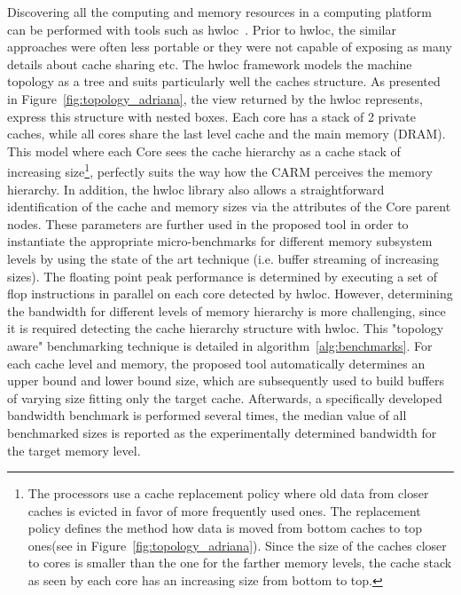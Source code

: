 \documentclass[twoside,twocolumn,9pt]{extarticle}
\begin{document}
Discovering all the computing and memory resources in a computing platform can be performed with tools such as
hwloc~\cite{goglin:hal-01330194}. Prior to hwloc,  the similar approaches were often less portable or they were not capable of
exposing as many details about cache sharing etc. The hwloc framework models the machine topology as a tree and suits particularly
well the caches structure.
As presented in Figure~\ref{fig:topology_adriana}, the view returned by the hwloc represents, express this structure with nested
boxes. Each core has a stack of 2 private caches, while all cores share the last level cache and the main memory (DRAM).
This model where each Core sees  the cache hierarchy as a cache stack of increasing size\footnote{
  The processors use a cache replacement policy where old data from closer caches is evicted in favor of more frequently used ones.
  The replacement policy defines the method how data is moved from bottom caches to top ones(see in
  Figure~\ref{fig:topology_adriana}). Since the size of the caches closer to cores is smaller than the one for the farther memory
  levels, the cache stack as seen by each core has an increasing size from bottom to top.
}, perfectly suits the way how the CARM perceives the memory hierarchy.
In addition, the hwloc library also allows a straightforward identification of the cache and memory sizes via the  attributes of
the Core parent nodes. These parameters are further used in the proposed tool  in order to instantiate the appropriate
micro-benchmarks for different memory subsystem levels by using the state of the art technique (i.e. buffer streaming of
increasing sizes).
The floating point peak performance is determined by executing a set of flop instructions in parallel on each core detected by
hwloc. However, determining the bandwidth for different levels of memory hierarchy  is more challenging, since it is required
detecting the cache hierarchy structure with hwloc. This "topology aware" benchmarking technique is detailed in
algorithm~\ref{alg:benchmarks}.
For each cache level and memory, the proposed tool automatically  determines an upper bound and lower bound size, which are
subsequently used to build buffers of varying size fitting only the target cache. Afterwards, a specifically developed bandwidth
benchmark is performed several times, the median value of all benchmarked sizes is reported as the experimentally determined bandwidth
for the target memory level.
\end{document}
